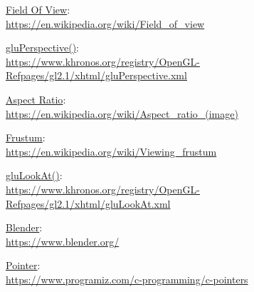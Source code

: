 \documentclass[12pt]{article}
\begin{document}



\begin{thebibliography}{9}

\underline{Field Of View}:\\
\url{https://en.wikipedia.org/wiki/Field_of_view}

\underline{gluPerspective()}:\\
\url{https://www.khronos.org/registry/OpenGL-Refpages/gl2.1/xhtml/gluPerspective.xml}

\underline{Aspect Ratio}:\\
\url{https://en.wikipedia.org/wiki/Aspect_ratio_(image)}

\underline{Frustum}:\\
\url{https://en.wikipedia.org/wiki/Viewing_frustum}

\underline{gluLookAt()}:\\
\url{https://www.khronos.org/registry/OpenGL-Refpages/gl2.1/xhtml/gluLookAt.xml}

\underline{Blender}:\\
\url{https://www.blender.org/}

\underline{Pointer}:\\
\url{https://www.programiz.com/c-programming/c-pointers}







\end{thebibliography}
\end{document}
